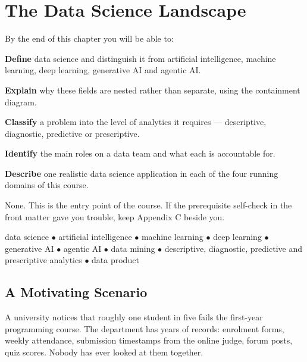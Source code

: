 \chapter{The Data Science Landscape}\label{ch:landscape}

\begin{outcomes}
By the end of this chapter you will be able to:
\begin{tight}
  \item \textbf{Define} data science and distinguish it from artificial intelligence, machine learning, deep learning, generative AI and agentic AI.
  \item \textbf{Explain} why these fields are nested rather than separate, using the containment diagram.
  \item \textbf{Classify} a problem into the level of analytics it requires --- descriptive, diagnostic, predictive or prescriptive.
  \item \textbf{Identify} the main roles on a data team and what each is accountable for.
  \item \textbf{Describe} one realistic data science application in each of the four running domains of this course.
\end{tight}
\end{outcomes}

\begin{prereq}
None. This is the entry point of the course. If the prerequisite self-check in the
front matter gave you trouble, keep Appendix C beside you.
\end{prereq}

\begin{keyterms}
data science $\bullet$ artificial intelligence $\bullet$ machine learning $\bullet$
deep learning $\bullet$ generative AI $\bullet$ agentic AI $\bullet$ data mining $\bullet$
descriptive, diagnostic, predictive and prescriptive analytics $\bullet$ data product
\end{keyterms}

\section{A Motivating Scenario}

A university notices that roughly one student in five fails the first-year
programming course. The department has years of records: enrolment forms, weekly
attendance, submission timestamps from the online judge, forum posts, quiz
scores. Nobody has ever looked at them together.

